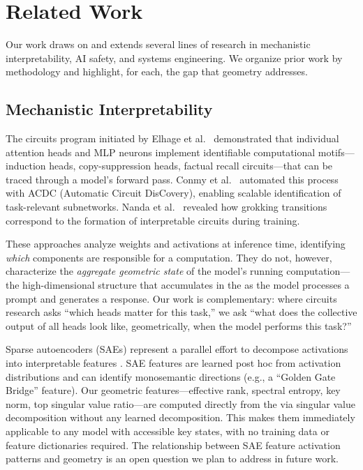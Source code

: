 
\section{Related Work}
\label{sec:related_work}

Our work draws on and extends several lines of research in mechanistic interpretability, AI safety, and systems engineering.
We organize prior work by methodology and highlight, for each, the gap that \kvcache geometry addresses.

\subsection{Mechanistic Interpretability}

The circuits program initiated by Elhage et al.\ \cite{elhage2022} demonstrated that individual attention heads and MLP neurons implement identifiable computational motifs---induction heads, copy-suppression heads, factual recall circuits---that can be traced through a model's forward pass.
Conmy et al.\ \cite{conmy2023} automated this process with ACDC (Automatic Circuit DisCovery), enabling scalable identification of task-relevant subnetworks.
Nanda et al.\ \cite{nanda2023} revealed how grokking transitions correspond to the formation of interpretable circuits during training.

These approaches analyze weights and activations at inference time, identifying \emph{which} components are responsible for a computation.
They do not, however, characterize the \emph{aggregate geometric state} of the model's running computation---the high-dimensional structure that accumulates in the \kvcache as the model processes a prompt and generates a response.
Our work is complementary: where circuits research asks ``which heads matter for this task,'' we ask ``what does the collective output of all heads look like, geometrically, when the model performs this task?''

Sparse autoencoders (SAEs) represent a parallel effort to decompose activations into interpretable features \cite{bricken2023,cunningham2023,templeton2024}.
SAE features are learned post hoc from activation distributions and can identify monosemantic directions (e.g., a ``Golden Gate Bridge'' feature).
Our geometric features---effective rank, spectral entropy, key norm, top singular value ratio---are computed directly from the \kvcache via singular value decomposition without any learned decomposition.
This makes them immediately applicable to any model with accessible key states, with no training data or feature dictionaries required.
The relationship between SAE feature activation patterns and \kvcache geometry is an open question we plan to address in future work.

